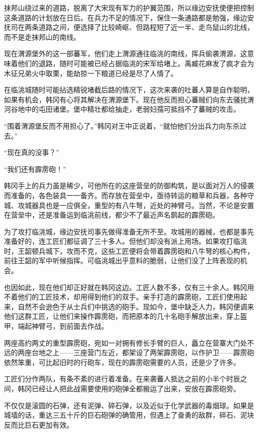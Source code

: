 抹邦山绕过来的道路，脱离了大宋现有军力的护翼范围，所以缘边安抚使便把控制这条道路的计划放在日后。在兵力不足的情况下，保住一条通路都是勉强，缘边安抚司在两条道路之间，便选择了比较崎岖、但路程短了近一半、走鸟鼠山的北线，而不是走抹邦山的南线。

现在渭源堡外的这一部蕃军，他们走上渭源通往临洮的南线，挥兵偷袭渭源，这意味着他们的退路，随时可能被已经占据临洮的宋军给堵上。禹臧花麻发了疯才会为木征兄弟火中取栗，能劫掠一下粮道已经是尽了人情了。

在临洮城随时可能拈选精锐堵截后路的情况下，这次来袭的吐蕃人算是自作聪明，如果有机会，韩冈有心将其解决在渭源堡下。现在他反而担心蕃贼们向东去骚扰渭河谷地中的屯田诸堡。堡中精壮都给抽走，老弱妇孺可抵挡不了蕃贼的攻击。

“围着渭源堡反而不用担心了。”韩冈对王中正说着，“就怕他们分出兵力向东杀过去。”

“现在真的没事？”

“我们还有霹雳砲！”

韩冈手上的兵力虽是稀少，可他所在的这座营垒的防御构筑，是以面对万人的侵袭而准备的，各色装具一一备齐。而存放在营垒中，亟待转运的粮草和兵器，各种守城、攻城器具也是一应俱全，重型的有八牛弩，近处的神臂弓。当然，不论是安置在营垒中，还是准备运到临洮前线，都少不了最近声名鹊起的霹雳砲。

为了攻打临洮城，缘边安抚司事先做得准备无所不至。攻城用的器械，也都是事先准备好的，连工匠们都征调了三十多人。但他们却没有派上用场。如果攻打临洮时，王韶顿兵城下，攻而不克，这些工匠便将会带着霹雳砲和八牛弩的核心构件，前往王韶的军中听候指挥。可临洮城出乎意料的脆弱，让他们没了上阵表现的机会。

也因如此，现在他们却正好就在韩冈这边。工匠人数不多，仅有三十余人。韩冈用不着他们的工匠技术，却用得到他们的双手。亲手打造的霹雳砲，工匠们使用起来，自然不会逊色于从士兵们中挑选的砲手。现如今，堡中缺乏人力，韩冈便调来他们这群工匠，让他们来操作霹雳砲，而把原本的几十名砲手解放出来，穿上盔甲，端起神臂弓，到前面去作战。

两座高约两丈的重型霹雳砲，宛如一对拥有修长手臂的巨人，矗立在营寨大门处不远的两座台地之上——三座营门左近，都架设了两架霹雳砲，以作护卫——霹雳砲依然笨重，可比起旧时的行砲车，现在的霹雳砲需要的人员，还是少了许多。

工匠们分作两队，有条不紊的进行着准备。在来袭蕃人抵达之前的小半个时辰之间，韩冈已经让人把此战需要使用的砲弹全都搬运了出来，安放在霹雳砲旁。

不仅仅是滚圆的石弹，还有泥弹、碎石弹，以及近似于化学武器的毒烟球。如果是城墙的话，重达三五十斤的巨石砲弹的确管用，但遇上了奋勇的敌群，碎石、泥块反而比巨石更加有效。

